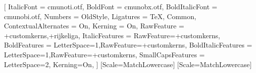 \setmainfont{cmunorm.otf}[
  ItalicFont = cmunoti.otf,
  BoldFont = cmunobx.otf,
  BoldItalicFont = cmunobi.otf,
  Numbers = OldStyle,
  Ligatures = {TeX, Common},
  ContextualAlternates = On,
  Kerning = On,
  RawFeature = {+customkerns,+rijkeliga},
  ItalicFeatures = {RawFeature={+customkerns}},
  BoldFeatures = {LetterSpace=1,RawFeature={+customkerns}},
  BoldItalicFeatures = {LetterSpace=1,RawFeature={+customkerns}},
  SmallCapsFeatures = {LetterSpace=2, Kerning=On},
]
\setsansfont{TeX Gyre Heros}[Scale=MatchLowercase]
\setmonofont{Inconsolatazi4}[Scale=MatchLowercase]
\linespread{1.08}

\newcommand{\VersionFontName}{CMU Concrete (Euler)}






